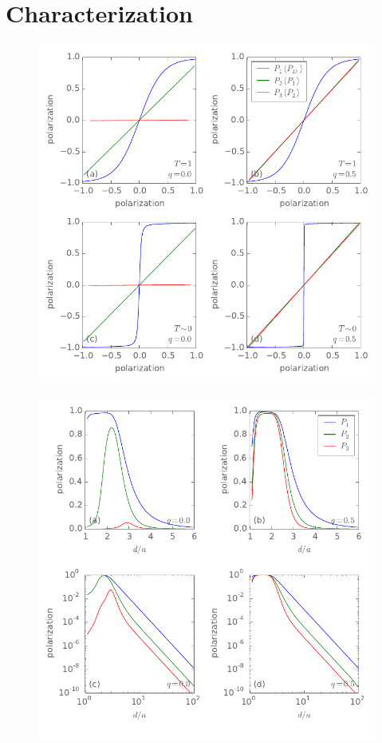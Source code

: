 \chapter{Characterization}
\graphicspath{{../gfx/chapter03/}{../plots/chapter03/}}

%
\begin{figure}
  \center
  \includegraphics{three_cells_PP}
  \caption{
  }
  \label{fig:three_cells_PP}
\end{figure}
%

%
\begin{figure}
  \center
  \includegraphics{three_cells_P_over_d}
  \caption{
  }
  \label{fig:three_cells_P_over_d}
\end{figure}
%

